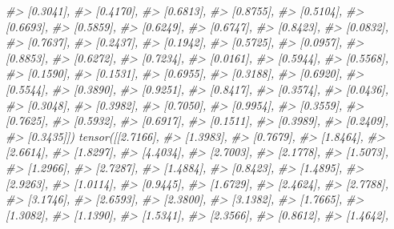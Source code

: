 \documentclass[]{book}
\newenvironment{Shaded}{\begin{snugshade}}{\end{snugshade}}
\newcommand{\CommentTok}[1]{\textcolor[rgb]{0.56,0.35,0.01}{\textit{#1}}}
\begin{document}
\begin{Shaded}
\begin{Highlighting}[]
\CommentTok{#>         [0.3041],}
\CommentTok{#>         [0.4170],}
\CommentTok{#>         [0.6813],}
\CommentTok{#>         [0.8755],}
\CommentTok{#>         [0.5104],}
\CommentTok{#>         [0.6693],}
\CommentTok{#>         [0.5859],}
\CommentTok{#>         [0.6249],}
\CommentTok{#>         [0.6747],}
\CommentTok{#>         [0.8423],}
\CommentTok{#>         [0.0832],}
\CommentTok{#>         [0.7637],}
\CommentTok{#>         [0.2437],}
\CommentTok{#>         [0.1942],}
\CommentTok{#>         [0.5725],}
\CommentTok{#>         [0.0957],}
\CommentTok{#>         [0.8853],}
\CommentTok{#>         [0.6272],}
\CommentTok{#>         [0.7234],}
\CommentTok{#>         [0.0161],}
\CommentTok{#>         [0.5944],}
\CommentTok{#>         [0.5568],}
\CommentTok{#>         [0.1590],}
\CommentTok{#>         [0.1531],}
\CommentTok{#>         [0.6955],}
\CommentTok{#>         [0.3188],}
\CommentTok{#>         [0.6920],}
\CommentTok{#>         [0.5544],}
\CommentTok{#>         [0.3890],}
\CommentTok{#>         [0.9251],}
\CommentTok{#>         [0.8417],}
\CommentTok{#>         [0.3574],}
\CommentTok{#>         [0.0436],}
\CommentTok{#>         [0.3048],}
\CommentTok{#>         [0.3982],}
\CommentTok{#>         [0.7050],}
\CommentTok{#>         [0.9954],}
\CommentTok{#>         [0.3559],}
\CommentTok{#>         [0.7625],}
\CommentTok{#>         [0.5932],}
\CommentTok{#>         [0.6917],}
\CommentTok{#>         [0.1511],}
\CommentTok{#>         [0.3989],}
\CommentTok{#>         [0.2409],}
\CommentTok{#>         [0.3435]]) tensor([[2.7166],}
\CommentTok{#>         [1.3983],}
\CommentTok{#>         [0.7679],}
\CommentTok{#>         [1.8464],}
\CommentTok{#>         [2.6614],}
\CommentTok{#>         [1.8297],}
\CommentTok{#>         [4.4034],}
\CommentTok{#>         [2.7003],}
\CommentTok{#>         [2.1778],}
\CommentTok{#>         [1.5073],}
\CommentTok{#>         [1.2966],}
\CommentTok{#>         [2.7287],}
\CommentTok{#>         [1.4884],}
\CommentTok{#>         [0.8423],}
\CommentTok{#>         [1.4895],}
\CommentTok{#>         [2.9263],}
\CommentTok{#>         [1.0114],}
\CommentTok{#>         [0.9445],}
\CommentTok{#>         [1.6729],}
\CommentTok{#>         [2.4624],}
\CommentTok{#>         [2.7788],}
\CommentTok{#>         [3.1746],}
\CommentTok{#>         [2.6593],}
\CommentTok{#>         [2.3800],}
\CommentTok{#>         [3.1382],}
\CommentTok{#>         [1.7665],}
\CommentTok{#>         [1.3082],}
\CommentTok{#>         [1.1390],}
\CommentTok{#>         [1.5341],}
\CommentTok{#>         [2.3566],}
\CommentTok{#>         [0.8612],}
\CommentTok{#>         [1.4642],}

\end{Highlighting}
\end{Shaded}
\end{document}

